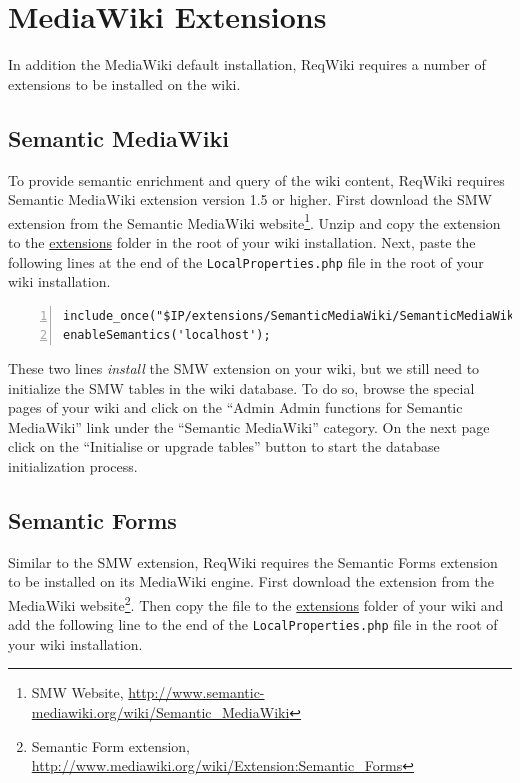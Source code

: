 \documentclass[10pt,twoside,openany,bibtotoc,liststotoc]{scrbook}
\begin{document}
\section{MediaWiki Extensions}
In addition the MediaWiki default installation, ReqWiki requires a number of extensions to be installed on the wiki.

\subsection{Semantic MediaWiki}
To provide semantic enrichment and query of the wiki content, ReqWiki requires Semantic MediaWiki extension version 1.5 or higher. First download the SMW extension from the Semantic MediaWiki website\footnote{SMW Website, \url{http://www.semantic-mediawiki.org/wiki/Semantic\_MediaWiki}}. Unzip and copy the extension to the \url{extensions} folder in the root of your wiki installation. Next, paste the following lines at the end of the \texttt{LocalProperties.php} file in the root of your wiki installation.

\begin{center}
\begin{lstlisting}[language=xml,numbers=left,xleftmargin=4mm,columns=flexible]
include_once("$IP/extensions/SemanticMediaWiki/SemanticMediaWiki.php");
enableSemantics('localhost');
\end{lstlisting}
\end{center}

These two lines \emph{install} the SMW extension on your wiki, but we still need to initialize the SMW tables in the wiki database. To do so, browse the special pages of your wiki and click on the ``Admin Admin functions for Semantic MediaWiki'' link under the ``Semantic MediaWiki'' category. On the next page click on the ``Initialise or upgrade tables'' button to start the database initialization process.

\subsection{Semantic Forms}
Similar to the SMW extension, ReqWiki requires the Semantic Forms extension to be installed on its MediaWiki engine. First download the extension from the MediaWiki website\footnote{Semantic Form extension, \url{http://www.mediawiki.org/wiki/Extension:Semantic_Forms}}. Then copy the file to the \url{extensions} folder of your wiki and add the following line to the end of the \texttt{LocalProperties.php} file in the root of your wiki installation.
\end{document}
